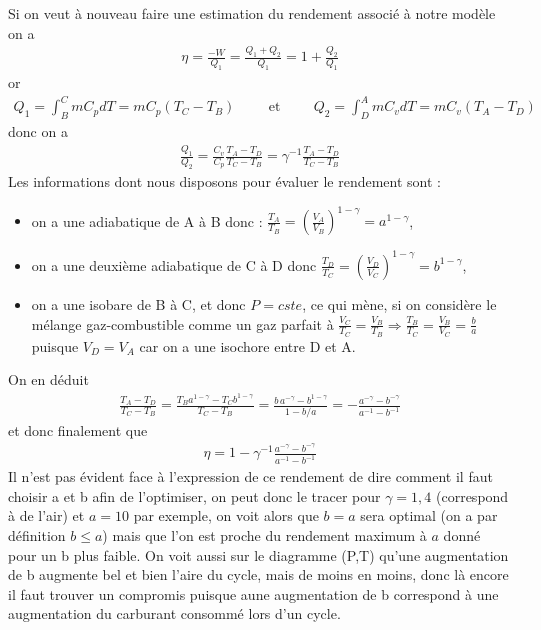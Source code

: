\documentclass[12pt,prb,aps,epsf]{report}
\begin{document}
Si on veut à nouveau faire une estimation du rendement associé à notre modèle on a 
\begin{eqnarray}
\eta = \frac{-W}{Q_1} = \frac{Q_1 + Q_2}{Q_1} = 1 + \frac{Q_2}{Q_1}
\end{eqnarray}
or 
\begin{eqnarray}
Q_1 = \int_B^C m C_p dT = mC_p(T_C-T_B) \hspace{1cm}\mathrm{et} \hspace{1cm} Q_2 = \int_D^A m C_v dT = mC_v(T_A-T_D)
\end{eqnarray}
donc on a 
\begin{eqnarray}
\frac{Q_1}{Q_2} = \frac{C_v}{C_p}\frac{T_A-T_D}{T_C-T_B} = \gamma^{-1}\frac{T_A-T_D}{T_C-T_B}
\end{eqnarray}
Les informations dont nous disposons pour évaluer le rendement sont :
\begin{itemize}
	\item on a une adiabatique de A à B donc : $\frac{T_A}{T_B} = \left(\frac{V_A}{V_B}\right)^{1-\gamma} = a^{1-\gamma}$,
	\item on a une deuxième adiabatique de C à D donc $\frac{T_D}{T_C} = \left(\frac{V_D}{V_C}\right)^{1-\gamma} = b^{1-\gamma}$,
	\item on a une isobare de B à C, et donc $P=cste$, ce qui mène, si on considère le mélange gaz-combustible comme un gaz parfait à $\frac{V_C}{T_C} = \frac{V_B}{T_B} \Rightarrow \frac{T_B}{T_C} = \frac{V_B}{V_C} = \frac{b}{a}$ puisque $V_D=V_A$ car on a une isochore entre D et A.
\end{itemize}
On en déduit 
\begin{eqnarray}
\frac{T_A-T_D}{T_C-T_B} = \frac{T_B a^{1-\gamma} - T_C b^{1-\gamma}}{T_C-T_B} = \frac{b\,a^{-\gamma} -  b^{1-\gamma}}{1-b/a} = -\frac{a^{-\gamma} -  b^{-\gamma}}{a^{-1}-b^{-1}}
\end{eqnarray}
et donc finalement que 
\begin{eqnarray}
\eta = 1 - \gamma^{-1} \frac{a^{-\gamma} -  b^{-\gamma}}{a^{-1}-b^{-1}}
\end{eqnarray}
Il n'est pas évident face à l'expression de ce rendement de dire comment il faut choisir a et b afin de l'optimiser, on peut donc le tracer pour $\gamma = 1,4$ (correspond à de l'air) et $a=10$ par exemple, on voit alors que $b = a$ sera optimal (on a par définition $b \leq a$) mais que l'on est proche du rendement maximum à $a$ donné pour un b plus faible. On voit aussi sur le diagramme (P,T) qu'une augmentation de b augmente bel et bien l'aire du cycle, mais de moins en moins, donc là encore il faut trouver un compromis puisque aune augmentation de b correspond à une augmentation du carburant consommé lors d'un cycle.
\end{document}
